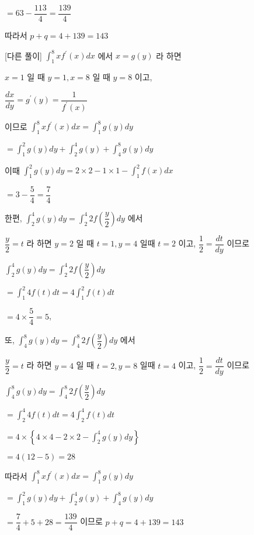 \documentclass{oblivoir}
\begin{document}
$=63-\dfrac{113}{4}=\dfrac{139}{4}$

따라서
$p+q=4+139=143$

[다른 풀이]
$\displaystyle\int_{1}^{8} x f^{\prime}(x) d x$ 에서 $x=g(y)$ 라 하면

$x=1$ 일 때 $y=1, x=8$ 일 때 $y=8$ 이고,

$\dfrac{d x}{d y}=g^{\prime}(y)=\dfrac{1}{f^{\prime}(x)}$

이므로
$\displaystyle\int_{1}^{8} x f^{\prime}(x) d x=\displaystyle\int_{1}^{8} g(y) d y$

$=\displaystyle\int_{1}^{2} g(y) d y+\displaystyle\int_{2}^{4} g(y)+\displaystyle\int_{4}^{8} g(y) d y$

이때
$\displaystyle\int_{1}^{2} g(y) d y=2 \times 2-1 \times 1-\displaystyle\int_{1}^{2} f(x) d x$

$=3-\dfrac{5}{4}=\dfrac{7}{4}$

한편, $\displaystyle\int_{2}^{4} g(y) d y=\displaystyle\int_{2}^{4} 2 f\left(\dfrac{y}{2}\right) d y$ 에서

$\dfrac{y}{2}=t$ 라 하면 $y=2$ 일 때 $t=1, y=4$ 일때 $t=2$ 이고, $\dfrac{1}{2}=\dfrac{d t}{d y}$ 이므로

$\displaystyle\int_{2}^{4} g(y) d y=\displaystyle\int_{2}^{4} 2 f\left(\dfrac{y}{2}\right) d y$

$=\displaystyle\int_{1}^{2} 4 f(t) d t=4 \displaystyle\int_{1}^{2} f(t) d t$

$=4 \times \dfrac{5}{4}=5$,

또, $\displaystyle\int_{4}^{8} g(y) d y=\displaystyle\int_{4}^{8} 2 f\left(\dfrac{y}{2}\right) d y$ 에서

$\dfrac{y}{2}=t$ 라 하면 $y=4$ 일 때 $t=2, y=8$ 일때 $t=4$ 이고, $\dfrac{1}{2}=\dfrac{d t}{d y}$ 이므로

$\displaystyle\int_{4}^{8} g(y) d y=\displaystyle\int_{4}^{8} 2 f\left(\dfrac{y}{2}\right) d y$

$=\displaystyle\int_{2}^{4} 4 f(t) d t=4 \displaystyle\int_{2}^{4} f(t) d t$

$=4 \times\left\{4 \times 4-2 \times 2-\displaystyle\int_{2}^{4} g(y) d y\right\}$

$=4(12-5)=28$

따라서
$\displaystyle\int_{1}^{8} x f^{\prime}(x) d x=\displaystyle\int_{1}^{8} g(y) d y$

$=\displaystyle\int_{1}^{2} g(y) d y+\displaystyle\int_{2}^{4} g(y)+\displaystyle\int_{4}^{8} g(y) d y$

$=\dfrac{7}{4}+5+28=\dfrac{139}{4}$
이므로
$p+q=4+139=143$
\end{document}

